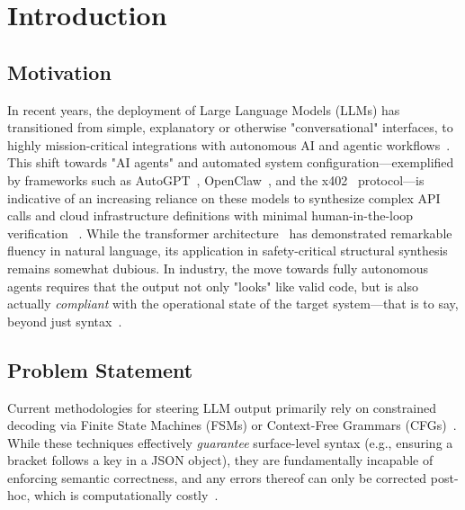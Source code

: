 \section{Introduction}

\subsection{Motivation}
In recent years, the deployment of Large Language Models (LLMs) has transitioned
from simple, explanatory or otherwise "conversational" interfaces, to highly
mission-critical integrations with autonomous AI and agentic workflows~\cite{autogpt2023}.
This shift towards "AI agents" and automated system configuration---exemplified
by frameworks such as AutoGPT~\cite{autogpt2023}, OpenClaw~\cite{openclaw2025}, and the x402~\cite{x4022025} protocol---is indicative
of an increasing reliance on these models to synthesize complex API calls and
cloud infrastructure definitions with minimal human-in-the-loop verification
~\cite{openclaw2025}. While the transformer architecture~\cite{vaswani2017attention} has demonstrated
remarkable fluency in natural language, its application in safety-critical
structural synthesis remains somewhat dubious. In industry, the move towards
fully autonomous agents requires that the output not only "looks" like valid
code, but is also actually \textit{compliant} with the operational state of the
target system---that is to say, beyond just syntax~\cite{poesia2022synchromesh}.

\subsection{Problem Statement}
Current methodologies for steering LLM output primarily rely on constrained
decoding via Finite State Machines (FSMs) or Context-Free Grammars
(CFGs)~\cite{poesia2022synchromesh}. While these techniques effectively \textit{guarantee}
surface-level syntax (e.g., ensuring a bracket follows a key in a JSON object),
they are fundamentally incapable of enforcing semantic correctness, and any
errors thereof can only be corrected post-hoc, which is computationally costly~\cite{poesia2022synchromesh}.

